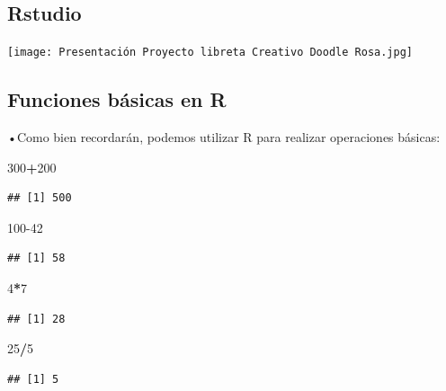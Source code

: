 \documentclass[
]{article}
\newenvironment{Shaded}{\begin{snugshade}}{\end{snugshade}}
\newcommand{\DecValTok}[1]{\textcolor[rgb]{0.00,0.00,0.81}{#1}}
\newcommand{\SpecialCharTok}[1]{\textcolor[rgb]{0.81,0.36,0.00}{\textbf{#1}}}
\begin{document}
\subsection{Rstudio}\label{rstudio}

\texttt{[image: Presentación Proyecto libreta Creativo Doodle Rosa.jpg]}

\subsection{Funciones básicas en R}\label{funciones-buxe1sicas-en-r}

•Como bien recordarán, podemos utilizar R para realizar operaciones
básicas:

\begin{Shaded}
\begin{Highlighting}[]
\DecValTok{300}\SpecialCharTok{+}\DecValTok{200}
\end{Highlighting}
\end{Shaded}

\begin{verbatim}
## [1] 500
\end{verbatim}

\begin{Shaded}
\begin{Highlighting}[]
\DecValTok{100{-}42}
\end{Highlighting}
\end{Shaded}

\begin{verbatim}
## [1] 58
\end{verbatim}

\begin{Shaded}
\begin{Highlighting}[]
\DecValTok{4}\SpecialCharTok{*}\DecValTok{7}
\end{Highlighting}
\end{Shaded}

\begin{verbatim}
## [1] 28
\end{verbatim}

\begin{Shaded}
\begin{Highlighting}[]
\DecValTok{25}\SpecialCharTok{/}\DecValTok{5}
\end{Highlighting}
\end{Shaded}

\begin{verbatim}
## [1] 5
\end{verbatim}
\end{document}

